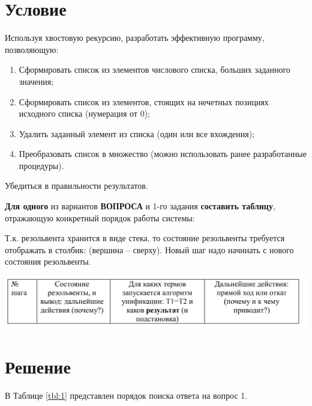 \section*{Условие}
Используя хвостовую рекурсию, разработать эффективную программу, позволяющую:
\begin{enumerate}
  \item Сформировать список из элементов числового списка, больших заданного
  значения;
  \item Сформировать список из элементов, стоящих на нечетных позициях исходного
  списка (нумерация от 0);
  \item Удалить заданный элемент из списка (один или все вхождения);
  \item Преобразовать список в множество (можно использовать ранее разработанные процедуры).
\end{enumerate}

Убедиться в правильности результатов.

\textbf{Для одного} из вариантов \textbf{ВОПРОСА} и 1-го задания \textbf{составить
таблицу}, отражающую конкретный порядок работы системы:

Т.к. резольвента хранится в виде стека, то состояние резольвенты требуется отображать
в столбик: (вершина – сверху). Новый шаг надо начинать с нового состояния резольвенты.  

\includegraphics[scale=0.4]{./inc/img/tb_tmpl}

\clearpage

\section*{Решение}







В Таблице \ref{tbl:1} представлен порядок поиска ответа на вопрос 1.

